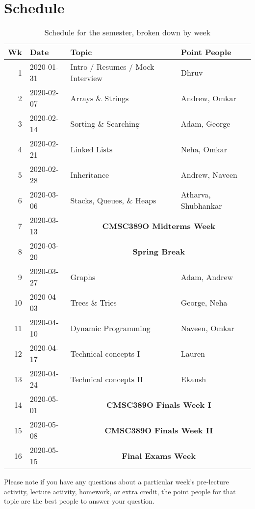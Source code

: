 \documentclass[12pt]{article}
\begin{document}
\section*{Schedule}
%
\begin{table}[H] %
  \begin{tabular}{@{}rlll}
    Wk & Date & Topic & Point People \\
    \hline
    1 & 2020-01-31 & Intro / Resumes / Mock Interview & Dhruv \\
    2 & 2020-02-07 & Arrays \& Strings                & Andrew, Omkar \\
    3 & 2020-02-14 & Sorting \& Searching             & Adam, George \\
    4 & 2020-02-21 & Linked Lists                     & Neha, Omkar \\
    5 & 2020-02-28 & Inheritance                      & Andrew, Naveen \\
    6 & 2020-03-06 & Stacks, Queues, \& Heaps         & Atharva, Shubhankar \\
    7 & 2020-03-13 & \multicolumn{2}{c}{\textbf{CMSC389O Midterms Week}} \\
    8 & 2020-03-20 & \multicolumn{2}{c}{\textbf{Spring Break}} \\
    9 & 2020-03-27 & Graphs                           & Adam, Andrew \\
    10& 2020-04-03 & Trees \& Tries                   & George, Neha \\
    11& 2020-04-10 & Dynamic Programming              & Naveen, Omkar \\
    12& 2020-04-17 & Technical concepts I             & Lauren \\
    13& 2020-04-24 & Technical concepts II            & Ekansh \\
    14& 2020-05-01 & \multicolumn{2}{c}{\textbf{CMSC389O Finals Week I}} \\
    15& 2020-05-08 & \multicolumn{2}{c}{\textbf{CMSC389O Finals Week II}} \\
    16& 2020-05-15 & \multicolumn{2}{c}{\textbf{Final Exams Week}}
  \end{tabular}
  \caption{Schedule for the semester, broken down by week}
  \label{tab:schedule}
\end{table}

Please note if you have any questions about a particular week’s pre-lecture activity, lecture activity, homework, or extra credit, the point people for that topic are the best people to answer your question.
\end{document}

